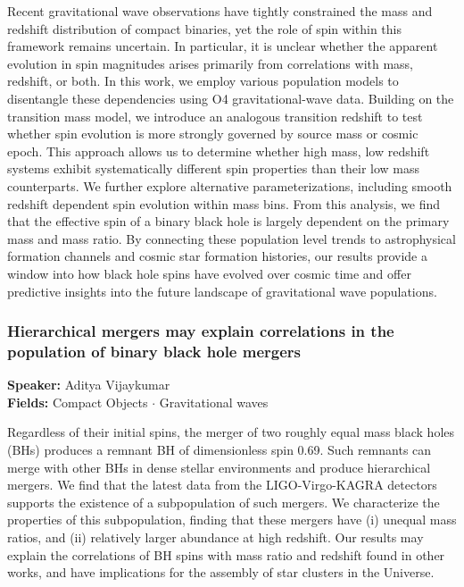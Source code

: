 Recent gravitational wave observations have tightly constrained the mass and redshift distribution of compact binaries, yet the role of spin within this framework remains uncertain. In particular, it is unclear whether the apparent evolution in spin magnitudes arises primarily from correlations with mass, redshift, or both. In this work, we employ various population models to disentangle these dependencies using O4 gravitational-wave data. Building on the transition mass model, we introduce an analogous transition redshift to test whether spin evolution is more strongly governed by source mass or cosmic epoch. This approach allows us to determine whether high mass, low redshift systems exhibit systematically different spin properties than their low mass counterparts. We further explore alternative parameterizations, including smooth redshift dependent spin evolution within mass bins. From this analysis, we find that the effective spin of a binary black hole is largely dependent on the primary mass and mass ratio. By connecting these population level trends to astrophysical formation channels and cosmic star formation histories, our results provide a window into how black hole spins have evolved over cosmic time and offer predictive insights into the future landscape of gravitational wave populations.

\hypertarget{abstract-talk-262}{}\label{abstract-page-talk-262}
\subsubsection*{Hierarchical mergers may explain correlations in the population of binary black hole mergers}
\textbf{Speaker:} Aditya Vijaykumar\\
\textbf{Fields:} Compact Objects $\cdot$ Gravitational waves

Regardless of their initial spins, the merger of two roughly equal mass black holes (BHs) produces a remnant BH of dimensionless spin 0.69. Such remnants can merge with other BHs in dense stellar environments and produce hierarchical mergers. We find that the latest data from the LIGO-Virgo-KAGRA detectors supports the existence of a subpopulation of such mergers. We characterize the properties of this subpopulation, finding that these mergers have (i) unequal mass ratios, and (ii) relatively larger abundance at high redshift. Our results may explain the correlations of BH spins with mass ratio and redshift found in other works, and have implications for the assembly of star clusters in the Universe.

